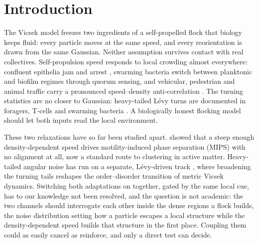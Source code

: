 \documentclass[aps,preprint,amsmath,amssymb,nofootinbib,superscriptaddress]{revtex4-2}
\begin{document}
\maketitle

\section{Introduction}

The Vicsek model \citep{Vicsek1995} freezes two ingredients of
a self-propelled flock that biology keeps fluid: every particle
moves at the same speed, and every reorientation is drawn from
the same Gaussian. Neither assumption survives contact with
real collectives. Self-propulsion speed responds to local
crowding almost everywhere: confluent epithelia
jam and arrest \citep{Bi2016}, swarming bacteria switch between
planktonic and biofilm regimes through quorum sensing, and
vehicular, pedestrian and animal traffic carry a pronounced
speed--density anti-correlation \citep{Greenshields, LWR}. The
turning statistics are no closer to Gaussian: heavy-tailed
L\'evy turns are documented in foragers, T-cells and swarming
bacteria \citep{Reynolds2018, Harris2012, Ariel2015}. A
biologically honest flocking model should let both inputs read
the local environment.

These two relaxations have so far been studied apart.
\citet{CatesTailleur2015} showed that a steep enough
density-dependent speed drives motility-induced phase
separation (MIPS) with no alignment at all, now a standard route
to clustering in active matter. Heavy-tailed angular noise has
run on a separate, L\'evy-driven track \citep{Eliazar2003,
Ariel2015}, where broadening the turning tails reshapes the
order--disorder transition of metric Vicsek dynamics. Switching
both adaptations on together, gated by the same local cue, has
to our knowledge not been resolved, and the question is not
academic: the two channels should interrogate each other
inside the dense regions a flock builds, the noise
distribution setting how a particle escapes a local structure
while the density-dependent speed builds that structure in the
first place. Coupling them could as easily cancel as reinforce,
and only a direct test can decide.
\end{document}
